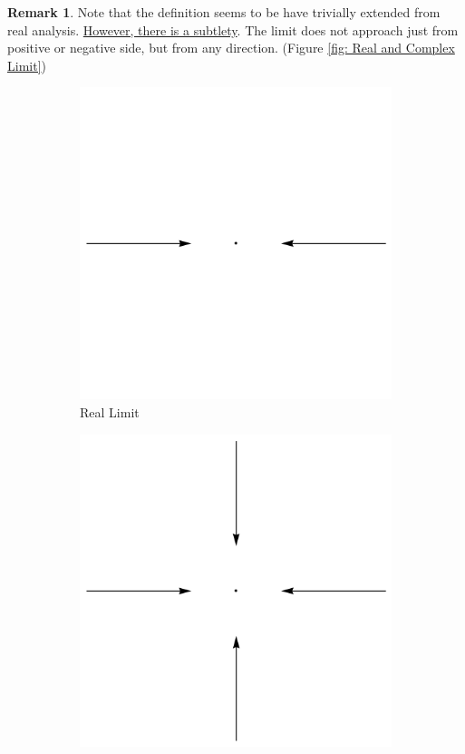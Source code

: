 \documentclass[a4paper, 12pt]{article}
\theoremstyle{definition}
\newtheorem{remark}{Remark}
\numberwithin{theorem}{section}
\numberwithin{definition}{section}
\numberwithin{exercise}{section}
\numberwithin{remark}{section}
\numberwithin{figure}{section}
\numberwithin{example}{section}
\begin{document}
\begin{remark}
    Note that the definition seems to be have trivially extended from real analysis.
    \ul{However, there is a subtlety}.
    The limit does not approach just from positive or negative side,
    but from any direction. (Figure \ref{fig: Real and Complex Limit})
    \begin{figure}[tbp]
        \centering
        \begin{subfigure}[b]{0.5\textwidth}
            \centering
            \includegraphics[width=\textwidth]{realLimit}
            \caption{Real Limit}
        \end{subfigure}
        \hfill
        \begin{subfigure}[b]{0.5\textwidth}
            \centering
            \includegraphics[width=\textwidth]{complexLimit}

\end{subfigure}
\end{figure}
\end{remark}
\end{document}

